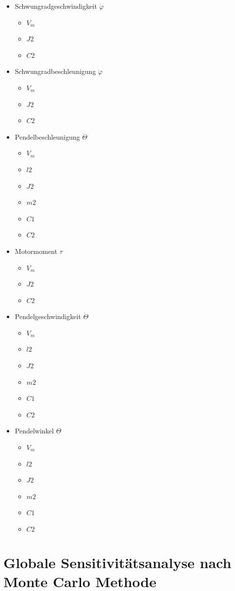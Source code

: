 \begin{itemize}
    \item Schwungradgeschwindigkeit $\dot\varphi$
    \begin{itemize}
        \item $V_m$
        \item $J2$
        \item $C2$
    \end{itemize}
    \item Schwungradbeschleunigung $\ddot\varphi$
    \begin{itemize}
        \item $V_m$
        \item $J2$
        \item $C2$
    \end{itemize}
    \item Pendelbeschleunigung $\ddot\Theta$
    \begin{itemize}
        \item $V_m$
        \item $l2$
        \item $J2$
        \item $m2$
        \item $C1$
        \item $C2$
    \end{itemize}
    \item Motormoment $\tau$
    \begin{itemize}
        \item $V_m$
        \item $J2$
        \item $C2$
    \end{itemize}
    \item Pendelgeschwindigkeit $\dot\Theta$
    \begin{itemize}
        \item $V_m$
        \item $l2$
        \item $J2$
        \item $m2$
        \item $C1$
        \item $C2$
    \end{itemize}
    \item Pendelwinkel $\Theta$
    \begin{itemize}
        \item $V_m$
        \item $l2$
        \item $J2$
        \item $m2$
        \item $C1$
        \item $C2$ 
    \end{itemize}
\end{itemize}

\section{Globale Sensitivitätsanalyse nach Monte Carlo Methode}
